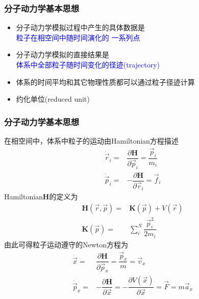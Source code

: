 \frame
{
	\frametitle{分子动力学基本思想}
	\begin{itemize}
			\setlength{\itemsep}{3pt}
		\item 分子动力学模拟过程中产生的具体数据是\\
			\textcolor{blue}{粒子在相空间中随时间演化的 一系列点}
		\item 分子动力学模拟的直接结果是\\
			\textcolor{blue}{体系中全部粒子随时间变化的径迹\textrm{(trajectory)}}
		\item 体系的时间平均和其它物理性质都可以通过粒子径迹计算
		\item 约化单位\textrm{(reduced unit)}\\
{\fontsize{7.2pt}{6.2pt}}
	\begin{enumerate}
{\fontsize{7.2pt}{6.2pt}}
	\end{enumerate}
	\end{itemize}
}

\frame
{
	\frametitle{分子动力学基本思想}
	在相空间中，体系中粒子的运动由\textrm{Hamiltonian}方程描述
	\begin{displaymath}
		\begin{aligned}
			\dot{\vec r}_i=&\dfrac{\partial\mathbf{H}}{\partial\vec p_i}=\dfrac{\vec p_i}{m_i}\\
			\dot{\vec p}_i=&-\dfrac{\partial\mathbf{H}}{\partial\vec r_i}=\vec f_i
		\end{aligned}
	\end{displaymath}
	\textrm{Hamiltonian}$\mathbf{H}$的定义为
	\begin{displaymath}
		\begin{aligned}
			\mathbf{H}(\vec r,\vec p)=&\mathbf{K}(\vec p)+V(\vec r)\\
			\mathbf{K}(\vec p)=&\sum_i^N\dfrac{\vec p_i^2}{2m_i}
		\end{aligned}
	\end{displaymath}
	由此可得粒子运动遵守的\textrm{Newton}方程为
	\begin{displaymath}
		\begin{aligned}
			\dot{\vec x}=&\dfrac{\partial\mathbf{H}}{\partial\vec p_x}=\dfrac{\vec p_x}m=\vec v_x\\
			\dot{\vec p}_x=&-\dfrac{\partial\mathbf{H}}{\partial{\vec x}}=-\dfrac{\partial V(\vec x)}{\partial\vec x}=\vec F=m\vec a_x
		\end{aligned}
	\end{displaymath}
}

